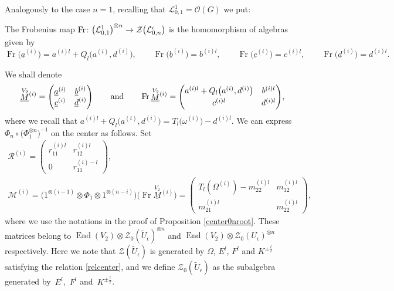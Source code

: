 \documentclass[pdftex]{sigma}%
\numberwithin{equation}{section}
\numberwithin{figure}{section}
\newcommand{\Ll}{{\mathcal L}}
\begin{document}
Analogously to the case $n=1$, recalling that $\Ll_{0,1}^1 = \mathcal{O}(G)$ we put:
\begin{defi} \label{defFrn} The Frobenius map ${\rm Fr}\colon \big(\Ll_{0,1}^1\big)^{\otimes n}\rightarrow \mathcal{Z}\big(\Ll_{0,n}^\epsilon\big)$ is the homomorphism of algebras given by
\[
\operatorname{Fr}\big(\underline{a}^{(i)}\big)=a^{(i)l}+Q_l\big(a^{(i)},d^{(i)}\big), \qquad \operatorname{Fr}\big(\underline{b}^{(i)}\big)=b^{(i)l},\qquad
\operatorname{Fr}\big(\underline{c}^{(i)}\big)=c^{(i)l}, \qquad \operatorname{Fr}\big(\underline{d}^{(i)}\big)=d^{(i)l}.
\]
\end{defi}
We shall denote
\begin{equation}\label{notFrmat}
\underline{\stackrel{V_2}{M}}{}^{(i)}=\begin{pmatrix} \underline{a}^{(i)} & \underline{b}^{(i)}\\ \underline{c}^{(i)}&\underline{d}^{(i)}\end{pmatrix}
\qquad {\rm and}\qquad
\operatorname{Fr}\underline{\stackrel{V_2}{M}}{}^{(i)}=\begin{pmatrix} a^{(i)l}+Q_l\big(a^{(i)},d^{(i)}\big)& b^{(i)l}\\[.5ex] c^{(i)l}&d^{(i)l}
\end{pmatrix}\!,
\end{equation}
where we recall that $a^{(i)l}+Q_l\big(a^{(i)},d^{(i)}\big) = T_l\big(\omega^{(i)}\big)- d^{(i)l}$. We can express $\Phi_n \circ \big(\Phi_1^{\otimes n}\big)^{-1}$ on the center as follows. Set
\begin{gather*}%
\mathcal{R}^{(i)} =\begin{pmatrix} r_{11}^{(i)l}& r_{12}^{(i)l}\\[.5ex] 0 &r_{11}^{(i)-l}\end{pmatrix}\!,
\\
\mathcal{M}^{(i)} = \big(1^{\otimes (i-1)} \otimes \Phi_1 \otimes 1^{\otimes (n-i)}\big)\big(\!\operatorname{Fr}\underline{\stackrel{V_2}{M}}{}^{(i)}\big)
 = \begin{pmatrix} T_l(\Omega^{(i)})- m_{22}^{(i)l} & m_{12}^{(i)l}\\[.5ex] m_{21}^{(i)l} & m_{22}^{(i)l} \end{pmatrix}\!,
\end{gather*}
where we use the notations in the proof of Proposition \ref{center0nroot}. These matrices belong to $\operatorname{End}(V_2) \otimes \mathcal{Z}_0(\tilde U_\epsilon)^{\otimes n}$ and $\operatorname{End}(V_2) \otimes \mathcal{Z}_0(U_\epsilon)^{\otimes n}$ respectively. Here we note that $\mathcal{Z}(\tilde U_\epsilon)$ is generated by $\Omega$, $E^l$, $F^l$ and $K^{\pm \frac{l}{2}}$ satisfying the relation \eqref{relcenter}, and we define $\mathcal{Z}_0(\tilde U_\epsilon)$ as the subalgebra generated by~$E^l$,~$F^l$ and~$K^{\pm \frac{l}{2}}$.
\end{document}
